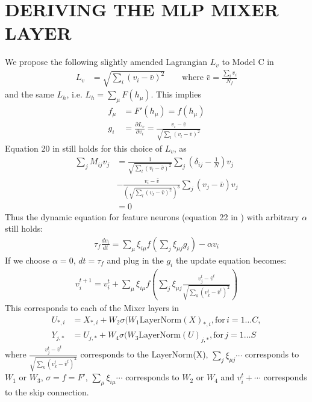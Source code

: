 \documentclass[letterpaper, 10 pt, conference]{ieeeconf}  %
\begin{document}
\section{DERIVING THE MLP MIXER LAYER}
\noindent
We propose the following slightly amended Lagrangian $L_v$ to Model C in \cite{krotov2021large}
\begin{align}
    L_v &= \sqrt{\sum_i (v_i - \bar v)^2}\qquad
    \text{where }\bar v = \frac{\sum_i v_i}{N_f}
\end{align} and the same $L_h$, i.e. $L_h = \sum_{\mu}F(h_{\mu})$. This implies
\begin{align}
    f_{\mu} &= F'(h_{\mu})\nonumber = f(h_\mu)\\
    g_i &= \frac{\partial L_v}{\partial v_i} = \frac{v_i - \bar v}{\sqrt{\sum_l (v_l-\bar v)^2}}
\end{align}
Equation 20 in \cite{krotov2021large} still holds for this choice of $L_v$, as
\begin{align}\label{modelc_zeromode}
\sum_j M_{ij}v_j &= \frac{1}{\sqrt{\sum_l(v_l - \bar v)^2}}\sum_j (\delta_{ij} - \frac{1}{N})v_j\nonumber\\
&- \frac{v_i - \bar v}{(\sqrt{\sum_l(v_l - \bar v)^2})^3}\sum_j(v_j - \bar v) v_j\nonumber\\
&=0
\end{align}
Thus the dynamic equation for feature neurons (equation 22 in \cite{krotov2021large}) with arbitrary $\alpha$ still holds:
\begin{align}\label{modelc_updateeqn}
\tau_f\frac{dv_i}{dt} = \sum_{\mu}\xi_{i\mu}f(\sum_j \xi_{\mu j}g_i) - \alpha v_i
\end{align}
If we choose $\alpha=0$, $dt=\tau_f$ and plug in the $g_i$ the update equation becomes:
\begin{align}\label{updateeqn_mixlayer}
    v_i^{t+1} = v_i^{t} + \sum_{\mu}\xi_{i\mu}f\left(\sum_j \xi_{\mu j} \frac{v_j^t - \bar v^t}{\sqrt{\sum_k (v_k^t - \bar v^t)^2}}\right)
\end{align}
This corresponds to each of the Mixer layers in \cite{tolstikhin2021mlpmixer}
\begin{align}
    U_{*, i} &= X_{*, i} + W_2\sigma(W_1 \text{LayerNorm}(X)_{*, i}, \text{for}\, i = 1\dots C,\nonumber\\
    Y_{j, *} &= U_{j, *} + W_4\sigma(W_3 \text{LayerNorm}(U)_{j, *}, \text{for}\, j = 1\dots S
\end{align}
where $\frac{v_j^t - \bar v^t}{\sqrt{\sum_k (v_k^t - \bar v^t)^2}}$ corresponds to the LayerNorm(X), $\sum_j \xi_{\mu j}\cdots$ corresponds to $W_1$ or $W_3$, $\sigma = f=F'$, $\sum_{\mu}\xi_{i\mu}\cdots$ corresponds to $W_2$ or $W_4$ and $v_i^{t} + \cdots$ corresponds to the skip connection.
\end{document}
